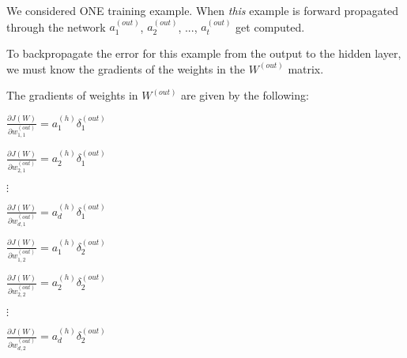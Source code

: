 \documentclass[../main.tex]{subfiles}
\begin{document}
We considered ONE training example. When \emph{this} example is forward propagated
through the network $a_1^{(out)}$, $a_2^{(out)}$, ..., $a_t^{(out)}$ get computed.

\vspace{5mm} %

To backpropagate the error for this example from the output to the hidden layer, 
we must know the gradients of the weights in the $W^{(out)}$ matrix.

\vspace{5mm} %

The gradients of weights in $W^{(out)}$ are given by the following:

\vspace{5mm} %

\begin{multicols}{3}

    $\frac{\partial J(W)}{\partial w_{1,1}^{(out)}} = a_1^{(h)} \delta_1^{(out)}$

    \vspace{5mm} %

    $\frac{\partial J(W)}{\partial w_{2,1}^{(out)}} = a_2^{(h)} \delta_1^{(out)}$

    \vspace{5mm} %

    $\vdots$

    \vspace{5mm} %

    $\frac{\partial J(W)}{\partial w_{d,1}^{(out)}} = a_d^{(h)} \delta_1^{(out)}$
    
    \columnbreak

    $\frac{\partial J(W)}{\partial w_{1,2}^{(out)}} = a_1^{(h)} \delta_2^{(out)}$

    \vspace{5mm} %

    $\frac{\partial J(W)}{\partial w_{2,2}^{(out)}} = a_2^{(h)} \delta_2^{(out)}$

    \vspace{5mm} %

    $\vdots$

    \vspace{5mm} %
    
    $\frac{\partial J(W)}{\partial w_{d,2}^{(out)}} = a_d^{(h)} \delta_2^{(out)}$

    \columnbreak
    

\end{multicols}
\end{document}
